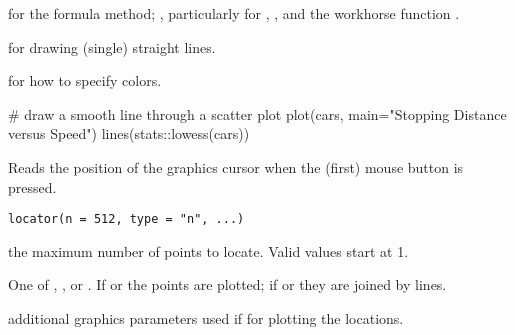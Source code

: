 %
\begin{SeeAlso}\relax
{} for the formula method;
, particularly for ,
,
and the workhorse function .

 for drawing (single) straight lines.

 for how to specify colors.
\end{SeeAlso}
%
\begin{Examples}
\begin{ExampleCode}
# draw a smooth line through a scatter plot
plot(cars, main="Stopping Distance versus Speed")
lines(stats::lowess(cars))
\end{ExampleCode}
\end{Examples}
%
\begin{Description}\relax
Reads the position of the graphics cursor when the (first) mouse
button is pressed.
\end{Description}
%
\begin{Usage}
\begin{verbatim}
locator(n = 512, type = "n", ...)
\end{verbatim}
\end{Usage}
%
\begin{Arguments}
\begin{ldescription}
\item[\code{n}] the maximum number of points to locate.  Valid values start
at 1.
\item[\code{type}] One of , ,  or
. If  or  the points are
plotted; if   or  they are joined by lines.
\item[\code{...}] additional graphics parameters used if 
for plotting the locations.
\end{ldescription}
\end{Arguments}
%

